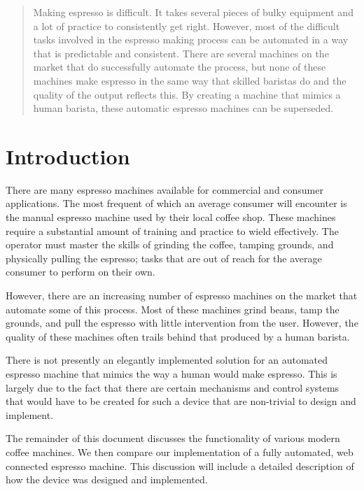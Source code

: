 \documentclass[conference]{IEEEtran}
\begin{document}
\begin{abstract}
Making espresso is difficult. It takes several pieces of bulky equipment and a
lot of practice to consistently get right. However, most of the difficult tasks
involved in the espresso making process can be automated in a way that is predictable and
consistent. There are several machines on the market that do successfully
automate the process, but none of these machines make espresso in the same way that
skilled baristas do and the quality of the output reflects this. By creating a
machine that mimics a human barista, these automatic espresso machines can be
superseded.
\end{abstract}


%
\section{Introduction} 

There are many espresso machines available for commercial and
consumer applications. The most frequent of which an average consumer will
encounter is the manual espresso machine used by their local coffee shop. These
machines require a substantial amount of training and practice to wield
effectively. The operator must master the skills of grinding the coffee, tamping
grounds, and physically pulling the espresso; tasks that are out of reach for
the average consumer to perform on their own.

However, there are an increasing number of espresso machines on the market that
automate some of this process.  Most of these machines grind beans, tamp the
grounds, and pull the espresso with little intervention from the user. However,
the quality of these machines often trails behind that produced by a human
barista.
 
There is not presently an elegantly implemented solution for an
automated espresso machine that mimics the way a human would make espresso. This
is largely due to the fact that there are certain mechanisms and control 
systems that would have to be created for such a device that are non-trivial to design and implement.

The remainder of this document discusses the functionality of various 
modern coffee machines. We then compare our implementation of a fully
automated, web connected espresso machine. This discussion will include a
detailed description of how the device was designed and implemented.
\end{document}
